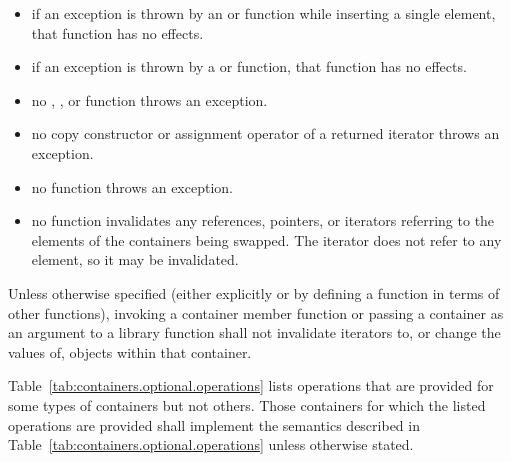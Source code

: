 \begin{itemize}
\item
if an exception is thrown by an
 or 
function while inserting a single element, that
function has no effects.
\item
if an exception is thrown by a
or
function, that function has no effects.
\item
no
,
,
or
function throws an exception.
\item
no copy constructor or assignment operator of a returned iterator
throws an exception.
\item
no
function throws an exception.
\item
no
function invalidates any references,
pointers, or iterators referring to the elements
of the containers being swapped. \enternote The  iterator does not refer to any element, so it may be invalidated. \exitnote
\end{itemize}

\pnum
Unless otherwise specified (either explicitly or by defining a
function in terms of other functions), invoking a container member
function or passing a container as an argument to a library function
shall not invalidate iterators to, or change the values of, objects
within that container.

\pnum
Table~\ref{tab:containers.optional.operations} lists operations that are provided
for some types of containers but not others. Those containers for which the
listed operations are provided shall implement the semantics described in
Table~\ref{tab:containers.optional.operations} unless otherwise stated.

